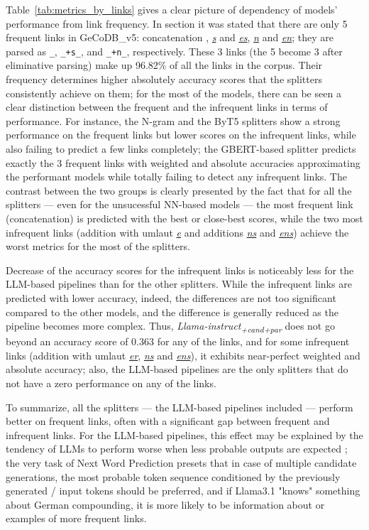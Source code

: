 \documentclass[11pt]{article}
\begin{document}
Table~\ref{tab:metrics_by_links} gives a clear picture of dependency of models' performance from link frequency. In section  it was stated that there are only 5 frequent links in GeCoDB\_v5: concatenation \textit{\underline{ }}, \textit{\underline{s}} and \textit{\underline{es}}, \textit{\underline{n}} and \textit{\underline{en}}; they are parsed as \texttt{\_}, \texttt{\_+s\_}, and \texttt{\_+n\_}, respectively. These 3 links (the 5 become 3 after eliminative parsing) make up 96.82\% of all the links in the corpus. Their frequency determines higher absolutely accuracy scores that the splitters consistently achieve on them; for the most of the models, there can be seen a clear distinction between the frequent and the infrequent links in terms of performance. For instance, the N-gram and the ByT5 splitters show a strong performance on the frequent links but lower scores on the infrequent links, while also failing to predict a few links completely; the GBERT-based splitter predicts exactly the 3 frequent links with weighted and absolute accuracies approximating the performant models while totally failing to detect any infrequent links. The contrast between the two groups is clearly presented by the fact that for all the splitters --- even for the unsucessful NN-based models --- the most frequent link (concatenation) is predicted with the best or close-best scores, while the two most infrequent links (addition with umlaut \textit{\underline{e}} and additions \textit{\underline{ns}} and \textit{\underline{ens}}) achieve the worst metrics for the most of the splitters.

Decrease of the accuracy scores for the infrequent links is noticeably less for the LLM-based pipelines than for the other splitters. While the infrequent links are predicted with lower accuracy, indeed, the differences are not too significant compared to the other models, and the difference is generally reduced as the pipeline becomes more complex. Thus, \textit{Llama-instruct\textsubscript{+cand+par}} does not go beyond an accuracy score of 0.363 for any of the links, and for some infrequent links (addition with umlaut \textit{\underline{er}}, \textit{\underline{ns}} and \textit{\underline{ens}}), it exhibits near-perfect weighted and absolute accuracy; also, the LLM-based pipelines are the only splitters that do not have a zero performance on any of the links.

To summarize, all the splitters --- the LLM-based pipelines included --- perform better on frequent links, often with a significant gap between frequent and infrequent links. For the LLM-based pipelines, this effect may be explained by the tendency of LLMs to perform worse when less probable outputs are expected \cite{mccoy2023embersautoregressionunderstandinglarge}; the very task of Next Word Prediction presets that in case of multiple candidate generations, the most probable token sequence conditioned by the previously generated / input tokens should be preferred, and if Llama3.1 "knows" something about German compounding, it is more likely to be information about or examples of more frequent links.
\end{document}
